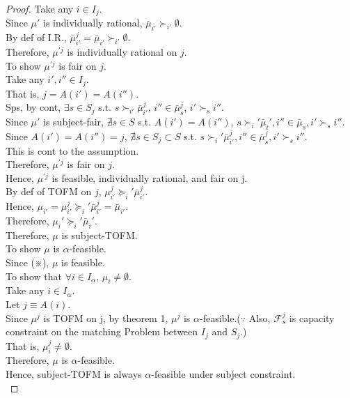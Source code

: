 \documentclass[a4j,10pt]{jsarticle}
\theoremstyle{definition}
\theoremstyle{remark}
\theoremstyle{plain}
\begin{document}
\begin{tcolorbox}[enhanced,breakable=true]
\begin{proof}
    Take any $i \in I_j$.\\
    Since $\mu'$ is individually rational, $\bar{\mu}_{i'} \succ_{i'} \emptyset$.\\
    By def of I.R., $\bar{\mu}^j_{i'} = \bar{\mu}_{i'}\succ_{i'} \emptyset$.\\
    Therefore, $\mu^{'j}$ is individually rational on $j$.\\
    To show $\mu^{'j}$ is fair on $j$.\\
    Take any $i',i'' \in I_j$.\\
    That is, $j = A(i') = A(i'')$.\\
    Sps, by cont,  $\exists s \in S_j$ s.t. $s \succ_{i'} \bar{\mu}^j_{i'}$, $i'' \in \bar{\mu}^j_s$, $i' \succ_s i''$.\\
    Since $\mu'$ is subject-fair, $\nexists s \in S$ s.t. $A(i') = A(i'')$, $s \succ_i' \bar{\mu}_i', i'' \in \bar{\mu}_s, i' \succ_s i''$.\\
    Since $A(i') = A(i'') = j$, $\nexists s \in S_j \subset S$  s.t. $s \succ_i' \bar{\mu}^j_{i'}, i'' \in \bar{\mu}^j_s, i' \succ_s i''$.\\
    This is cont to the assumption.\\
    Therefore, $\mu^{'j}$ is fair on $j$.\\
    Hence, $\mu^{'j}$ is feasible, individually rational, and fair on j.\\
    By def of TOFM on $j$, $\mu^j_{i'} \succeq_i' \bar{\mu}^j_{i'}$.\\
    Hence, $\mu_{i'} = \mu^j_{i'} \succeq_i' \bar{\mu}^j_{i'} = \bar{\mu}_{i'}$.\\
    Therefore, $\mu_i' \succeq_i' \bar{\mu}_i'$.\\
    Therefore, $\mu$ is subject-TOFM.\\

    To show $\mu$ is $\alpha$-feasible.\\
    Since (※), $\mu$ is feasible.\\
    To show that $\forall i \in I_\alpha$, $\mu_i \neq \emptyset$.\\
    Take any $i \in I_\alpha$.\\
    Let $j \equiv A(i)$.\\
    Since $\mu^j$ is TOFM on j, by theorem 1, $\mu^j$ is $\alpha$-feasible.($\because$ Also, $\mathcal{F}^j_s$ is capacity constraint on the matching Problem between $I_j$ and $S_j$.)\\
    That is, $\mu^j_i \neq \emptyset$.\\
    Therefore, $\mu$ is $\alpha$-feasible.\\
    Hence, subject-TOFM is always $\alpha$-feasible under subject constraint.\\
  \end{proof}
\end{tcolorbox}
\end{document}
